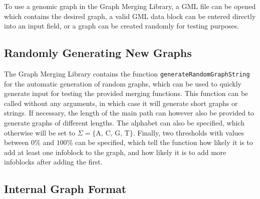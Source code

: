 \documentclass[a4paper,12pt,twoside,BCOR=10mm]{scrbook}
\begin{document}
To use a genomic graph in the Graph Merging Library,
a GML file can be opened which contains the desired graph,
a valid GML data block can be entered directly into an input field,
or a graph can be created randomly for testing purposes.

\subsection{Randomly Generating New Graphs}

The Graph Merging Library contains the function \texttt{generateRandomGraphString} for
the automatic generation of random graphs, which can be used to quickly generate input for testing the
provided merging functions.
This function can be called without any arguments, in which case it will generate short graphs
or strings. If necessary, the length of the main path can however also be provided to generate
graphs of different lengths. The alphabet can also be specified, which otherwise will be
set to $ \Sigma = \{ \textrm{A, C, G, T} \} $. Finally, two thresholds with values between $ 0\% $ and $ 100\% $ can
be specified, which tell the function how likely it is to add at least one infoblock to the graph,
and how likely it is to add more infoblocks after adding the first.


\subsection{Internal Graph Format}
\label{sec:internal_graph_format}
\end{document}

